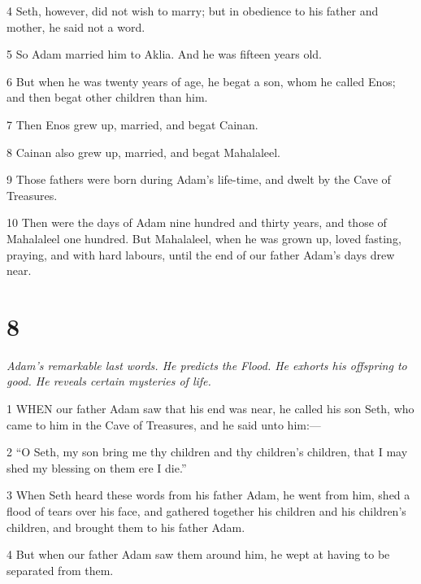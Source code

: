 \par 4 Seth, however, did not wish to marry; but in obedience to his father and mother, he said not a word.

\par 5 So Adam married him to Aklia. And he was fifteen years old.

\par 6 But when he was twenty years of age, he begat a son, whom he called Enos; and then begat other children than him.

\par 7 Then Enos grew up, married, and begat Cainan.

\par 8 Cainan also grew up, married, and begat Mahalaleel.

\par 9 Those fathers were born during Adam's life-time, and dwelt by the Cave of Treasures.

\par 10 Then were the days of Adam nine hundred and thirty years, and those of Mahalaleel one hundred. But Mahalaleel, when he was grown up, loved fasting, praying, and with hard labours, until the end of our father Adam's days drew near.

\chapter{8}

\par \textit{Adam's remarkable last words. He predicts the Flood. He exhorts his offspring to good. He reveals certain mysteries of life.}

\par 1 WHEN our father Adam saw that his end was near, he called his son Seth, who came to him in the Cave of Treasures, and he said unto him:—

\par 2 “O Seth, my son bring me thy children and thy children's children, that I may shed my blessing on them ere I die.”

\par 3 When Seth heard these words from his father Adam, he went from him, shed a flood of tears over his face, and gathered together his children and his children's children, and brought them to his father Adam.

\par 4 But when our father Adam saw them around him, he wept at having to be separated from them.

